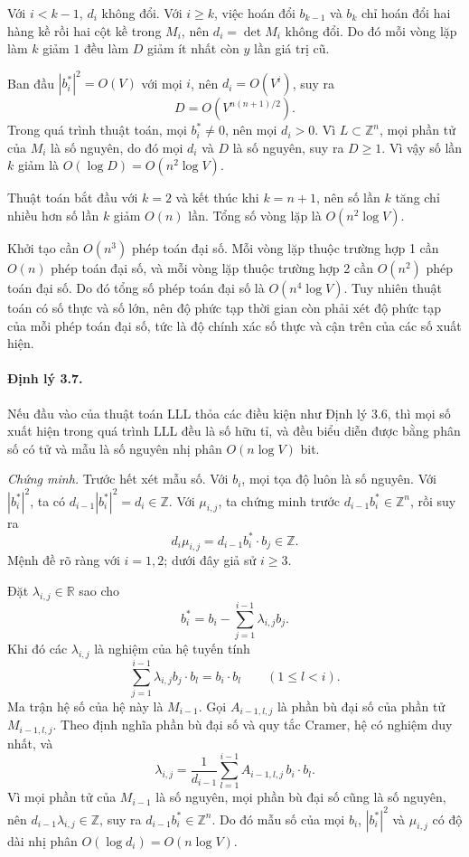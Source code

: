\documentclass[11pt]{article}
\begin{document}
Với \(i<k-1\), \(d_i\) không đổi. Với \(i\ge k\), việc hoán đổi \(b_{k-1}\) và
\(b_k\) chỉ hoán đổi hai hàng kề rồi hai cột kề trong \(M_i\), nên
\(d_i=\det M_i\) không đổi. Do đó mỗi vòng lặp làm \(k\) giảm \(1\) đều làm
\(D\) giảm ít nhất còn \(y\) lần giá trị cũ.

Ban đầu \(|b_i^*|^2=O(V)\) với mọi \(i\), nên \(d_i=O(V^i)\), suy ra
\[
  D=O(V^{n(n+1)/2}).
\]
Trong quá trình thuật toán, mọi \(b_i^*\ne0\), nên mọi \(d_i>0\). Vì
\(L\subset\mathbb Z^n\), mọi phần tử của \(M_i\) là số nguyên, do đó mọi \(d_i\)
và \(D\) là số nguyên, suy ra \(D\ge1\). Vì vậy số lần \(k\) giảm là
\(O(\log D)=O(n^2\log V)\).

Thuật toán bắt đầu với \(k=2\) và kết thúc khi \(k=n+1\), nên số lần \(k\) tăng
chỉ nhiều hơn số lần \(k\) giảm \(O(n)\) lần. Tổng số vòng lặp là
\(O(n^2\log V)\).

Khởi tạo cần \(O(n^3)\) phép toán đại số. Mỗi vòng lặp thuộc trường hợp 1 cần
\(O(n)\) phép toán đại số, và mỗi vòng lặp thuộc trường hợp 2 cần \(O(n^2)\)
phép toán đại số. Do đó tổng số phép toán đại số là \(O(n^4\log V)\). Tuy
nhiên thuật toán có số thực và số lớn, nên độ phức tạp thời gian còn phải xét
độ phức tạp của mỗi phép toán đại số, tức là độ chính xác số thực và cận trên
của các số xuất hiện.

\paragraph{Định lý 3.7.}
Nếu đầu vào của thuật toán LLL thỏa các điều kiện như Định lý 3.6, thì mọi số
xuất hiện trong quá trình LLL đều là số hữu tỉ, và đều biểu diễn được bằng
phân số có tử và mẫu là số nguyên nhị phân \(O(n\log V)\) bit.

\emph{Chứng minh.}
Trước hết xét mẫu số. Với \(b_i\), mọi tọa độ luôn là số nguyên. Với
\(|b_i^*|^2\), ta có \(d_{i-1}|b_i^*|^2=d_i\in\mathbb Z\). Với \(\mu_{i,j}\),
ta chứng minh trước \(d_{i-1}b_i^*\in\mathbb Z^n\), rồi suy ra
\[
  d_i\mu_{i,j}=d_{i-1}b_i^*\cdot b_j\in\mathbb Z.
\]
Mệnh đề rõ ràng với \(i=1,2\); dưới đây giả sử \(i\ge3\).

Đặt \(\lambda_{i,j}\in\mathbb R\) sao cho
\[
  b_i^*=b_i-\sum_{j=1}^{i-1}\lambda_{i,j}b_j.
\]
Khi đó các \(\lambda_{i,j}\) là nghiệm của hệ tuyến tính
\[
  \sum_{j=1}^{i-1}\lambda_{i,j}b_j\cdot b_l=b_i\cdot b_l
  \qquad (1\le l<i).
\]
Ma trận hệ số của hệ này là \(M_{i-1}\). Gọi \(A_{i-1,l,j}\) là phần bù đại số
của phần tử \(M_{i-1,l,j}\). Theo định nghĩa phần bù đại số và quy tắc Cramer,
hệ có nghiệm duy nhất, và
\[
  \lambda_{i,j}=\frac1{d_{i-1}}\sum_{l=1}^{i-1}A_{i-1,l,j}\,b_i\cdot b_l.
\]
Vì mọi phần tử của \(M_{i-1}\) là số nguyên, mọi phần bù đại số cũng là số
nguyên, nên \(d_{i-1}\lambda_{i,j}\in\mathbb Z\), suy ra
\(d_{i-1}b_i^*\in\mathbb Z^n\). Do đó mẫu số của mọi \(b_i\), \(|b_i^*|^2\) và
\(\mu_{i,j}\) có độ dài nhị phân \(O(\log d_i)=O(n\log V)\).
\end{document}

